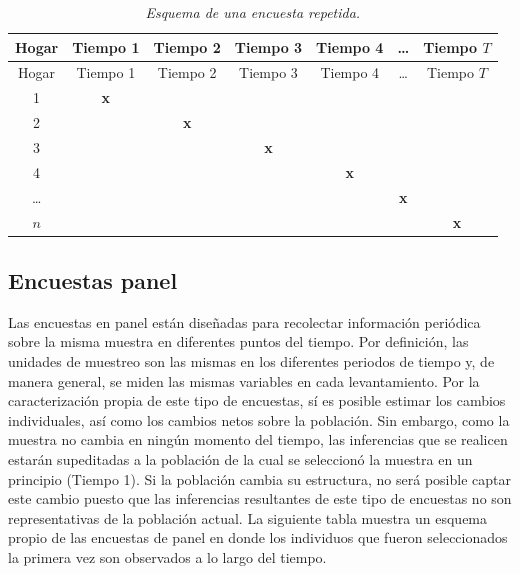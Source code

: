 \documentclass[
  12pt,
  spanish,
]{book}
\begin{document}
\begin{longtable}[]{@{}ccccccc@{}}
\caption{\emph{Esquema de una encuesta repetida.}}\tabularnewline
\toprule
Hogar & Tiempo 1 & Tiempo 2 & Tiempo 3 & Tiempo 4 & \ldots{} & Tiempo \(T\) \\
\midrule
\endfirsthead
\toprule
Hogar & Tiempo 1 & Tiempo 2 & Tiempo 3 & Tiempo 4 & \ldots{} & Tiempo \(T\) \\
\midrule
\endhead
1 & \textbf{x} & & & & & \\
2 & & \textbf{x} & & & & \\
3 & & & \textbf{x} & & & \\
4 & & & & \textbf{x} & & \\
\ldots{} & & & & & \textbf{x} & \\
\(n\) & & & & & & \textbf{x} \\
\bottomrule
\end{longtable}

\hypertarget{encuestas-panel}{%
\subsection*{Encuestas panel}\label{encuestas-panel}}

Las encuestas en panel están diseñadas para recolectar información periódica sobre la misma muestra en diferentes puntos del tiempo. Por definición, las unidades de muestreo son las mismas en los diferentes periodos de tiempo y, de manera general, se miden las mismas variables en cada levantamiento. Por la caracterización propia de este tipo de encuestas, sí es posible estimar los cambios individuales, así como los cambios netos sobre la población. Sin embargo, como la muestra no cambia en ningún momento del tiempo, las inferencias que se realicen estarán supeditadas a la población de la cual se seleccionó la muestra en un principio (Tiempo 1). Si la población cambia su estructura, no será posible captar este cambio puesto que las inferencias resultantes de este tipo de encuestas no son representativas de la población actual. La siguiente tabla muestra un esquema propio de las encuestas de panel en donde los individuos que fueron seleccionados la primera vez son observados a lo largo del tiempo.
\end{document}
